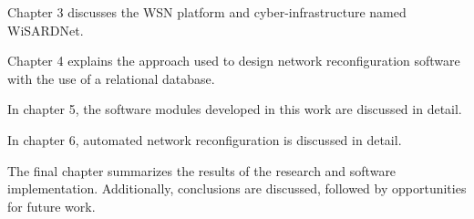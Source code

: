 
Chapter 3 discusses the WSN platform and cyber-infrastructure named WiSARDNet. 


Chapter 4 explains the approach used to design network reconfiguration software with the use of a relational database.


In chapter 5, the software modules developed in this work are discussed in detail.


In chapter 6, automated network reconfiguration is discussed in detail.


The final chapter summarizes the results of the research and software implementation. Additionally, conclusions are discussed, followed by opportunities for future work.